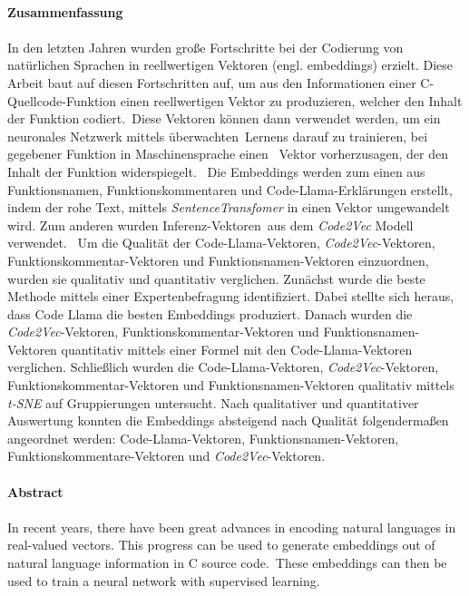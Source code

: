 \documentclass[12pt,letterpaper,ngerman]{article}
\begin{document}
\vspace{1,5cm}
\newpage \hfill\\
{\bf \Large Zusammenfassung}\\\\
In den letzten Jahren wurden große Fortschritte bei der Codierung von 
natürlichen Sprachen in reellwertigen Vektoren (engl. embeddings) erzielt.
Diese Arbeit baut auf diesen Fortschritten auf, um aus den 
Informationen einer C-Quellcode-Funktion einen reellwertigen 
Vektor zu produzieren,
welcher den Inhalt der Funktion codiert. Diese Vektoren können dann 
verwendet werden, um ein neuronales Netzwerk mittels überwachten Lernens 
darauf zu trainieren, bei gegebener Funktion in Maschinensprache einen 
Vektor vorherzusagen, der den Inhalt der Funktion widerspiegelt. 
Die Embeddings werden zum einen aus Funktionsnamen, Funktionskommentaren 
und Code-Llama-Erklärungen \cite{rozière2024codellamaopenfoundation} 
erstellt, indem der rohe Text, mittels \textit{SentenceTransfomer} 
\cite{reimers-2019-sentence-bert} in einen Vektor umgewandelt wird.
Zum anderen wurden Inferenz-Vektoren aus dem 
\textit{Code2Vec} \cite{code2vec} Modell verwendet.  
Um die Qualität der Code-Llama-Vektoren, \textit{Code2Vec}-Vektoren, 
Funktionskommentar-Vektoren und Funktionsnamen-Vektoren einzuordnen,
wurden sie qualitativ und quantitativ verglichen. Zunächst wurde die 
beste Methode mittels einer Expertenbefragung identifiziert.  
Dabei stellte sich heraus, dass Code Llama die besten Embeddings 
produziert. Danach wurden die \textit{Code2Vec}-Vektoren, 
Funktionskommentar-Vektoren und Funktionsnamen-Vektoren quantitativ 
mittels einer Formel mit den Code-Llama-Vektoren verglichen. 
Schließlich wurden die Code-Llama-Vektoren, \textit{Code2Vec}-Vektoren,
Funktionskommentar-Vektoren und Funktionsnamen-Vektoren qualitativ
mittels \textit{t-SNE} auf Gruppierungen untersucht. Nach
qualitativer 
und quantitativer Auswertung konnten die Embeddings 
absteigend nach Qualität folgendermaßen angeordnet werden:
Code-Llama-Vektoren, Funktionsnamen-Vektoren, 
Funktionskommentare-Vektoren und \textit{Code2Vec}-Vektoren.
\\\\
{\bf \Large Abstract}\\\\
In recent years, there have been great advances in encoding 
natural languages in real-valued vectors. This  progress can
be used to generate embeddings out of natural language 
information in C source code. These embeddings can then be 
used to train a neural network with supervised learning.
\end{document}
